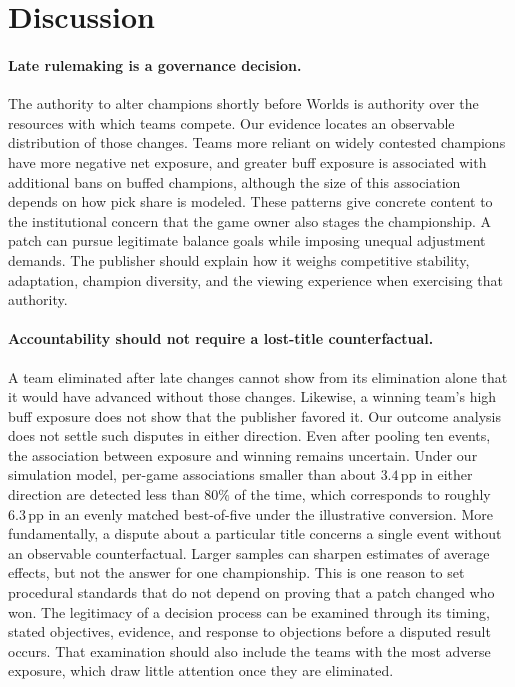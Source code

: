 \documentclass[11pt]{article}
\newcommand{\pp}{\,pp}
\begin{document}
\FloatBarrier
\section{Discussion}
\label{sec:discussion}

\paragraph{Late rulemaking is a governance decision.} The authority to alter champions shortly before Worlds is authority over the resources with which teams compete. Our evidence locates an observable distribution of those changes. Teams more reliant on widely contested champions have more negative net exposure, and greater buff exposure is associated with additional bans on buffed champions, although the size of this association depends on how pick share is modeled. These patterns give concrete content to the institutional concern that the game owner also stages the championship. A patch can pursue legitimate balance goals while imposing unequal adjustment demands. The publisher should explain how it weighs competitive stability, adaptation, champion diversity, and the viewing experience when exercising that authority.

\paragraph{Accountability should not require a lost-title counterfactual.} A team eliminated after late changes cannot show from its elimination alone that it would have advanced without those changes. Likewise, a winning team's high buff exposure does not show that the publisher favored it. Our outcome analysis does not settle such disputes in either direction. Even after pooling ten events, the association between exposure and winning remains uncertain. Under our simulation model, per-game associations smaller than about $3.4$\pp{} in either direction are detected less than $80\%$ of the time, which corresponds to roughly $6.3$\pp{} in an evenly matched best-of-five under the illustrative conversion. More fundamentally, a dispute about a particular title concerns a single event without an observable counterfactual. Larger samples can sharpen estimates of average effects, but not the answer for one championship. This is one reason to set procedural standards that do not depend on proving that a patch changed who won. The legitimacy of a decision process can be examined through its timing, stated objectives, evidence, and response to objections before a disputed result occurs. That examination should also include the teams with the most adverse exposure, which draw little attention once they are eliminated.
\end{document}
